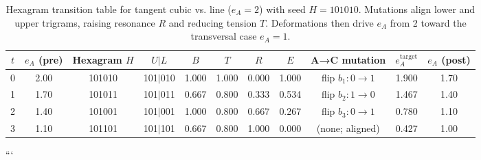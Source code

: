 \documentclass[12pt]{article}
\begin{document}
\begin{table}[h]
\centering
\begin{tabular}{c|c|c|c|cccc|c|c|c}
\hline
$t$ & $e_A$ (pre) & Hexagram $H$ & $U|L$ & $B$ & $T$ & $R$ & $E$ & A→C mutation & $e_A^{\text{target}}$ & $e_A$ (post) \\
\hline
0 & 2.00 & 101010 & 101$|$010 & 1.000 & 1.000 & 0.000 & 1.000 & flip $b_1:0\to 1$ & 1.900 & 1.70 \\
1 & 1.70 & 101011 & 101$|$011 & 0.667 & 0.800 & 0.333 & 0.534 & flip $b_2:1\to 0$ & 1.467 & 1.40 \\
2 & 1.40 & 101001 & 101$|$001 & 1.000 & 0.800 & 0.667 & 0.267 & flip $b_3:0\to 1$ & 0.780 & 1.10 \\
3 & 1.10 & 101101 & 101$|$101 & 0.667 & 0.800 & 1.000 & 0.000 & (none; aligned) & 0.427 & 1.00 \\
\hline
\end{tabular}
\caption{Hexagram transition table for tangent cubic vs. line ($e_A=2$) with seed $H=101010$. Mutations align lower and upper trigrams, raising resonance $R$ and reducing tension $T$. Deformations then drive $e_A$ from 2 toward the transversal case $e_A=1$.}
\end{table}
```

\nocite{*}


\clearpage
\end{document}
